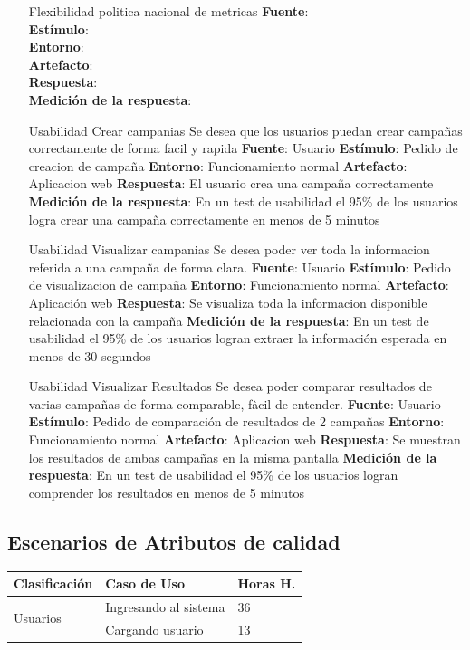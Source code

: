 \documentclass[a4paper, 11pt]{article}
\begin{document}
\begin{itemize}
\item[Flexibilidad] politica nacional de metricas
\textbf{Fuente}:  \\
\textbf{Estímulo}: \\
\textbf{Entorno}: \\
\textbf{Artefacto}: \\
\textbf{Respuesta}: \\
\textbf{Medición de la respuesta}: \\

\item[Usabilidad] Crear campanias
Se desea que los usuarios puedan crear campañas correctamente de forma facil y rapida
\textbf{Fuente}:  Usuario
\textbf{Estímulo}: Pedido de creacion de campaña
\textbf{Entorno}: Funcionamiento normal
\textbf{Artefacto}: Aplicacion web
\textbf{Respuesta}: El usuario crea una campaña correctamente
\textbf{Medición de la respuesta}: En un test de usabilidad el 95\% de los usuarios logra crear una campaña correctamente en menos de 5 minutos

\item[Usabilidad] Visualizar campanias
Se desea poder ver toda la informacion referida a una campaña de forma clara.
\textbf{Fuente}:  Usuario
\textbf{Estímulo}: Pedido de visualizacion de campaña
\textbf{Entorno}: Funcionamiento normal
\textbf{Artefacto}: Aplicación web
\textbf{Respuesta}: Se visualiza toda la informacion disponible relacionada con la campaña
\textbf{Medición de la respuesta}: En un test de usabilidad el 95\% de los usuarios logran extraer la información esperada en menos de 30 segundos

\item[Usabilidad] Visualizar Resultados
Se desea poder comparar resultados de varias campañas de forma comparable, fàcil de entender.
\textbf{Fuente}: Usuario
\textbf{Estímulo}: Pedido de comparación de resultados de 2 campañas
\textbf{Entorno}: Funcionamiento normal
\textbf{Artefacto}: Aplicacion web
\textbf{Respuesta}: Se muestran los resultados de ambas campañas en la misma pantalla
\textbf{Medición de la respuesta}: En un test de usabilidad el 95\% de los usuarios logran comprender los resultados en menos de 5 minutos

\end{itemize}
\subsection{Escenarios de Atributos de calidad}
\begin{table}[H]
\centering
\begin{tabular}{ | p{5cm} | p{8cm} | p{1.5cm} | }
\hline
Clasificación & Caso de Uso & Horas H.\\ \hline \hline
\multirow{2}{5cm}{Usuarios} & Ingresando al sistema & 36 \\ \cline{2-3}
& Cargando usuario & 13 \\ \hline
\end{tabular}
\end{table}
\end{document}
